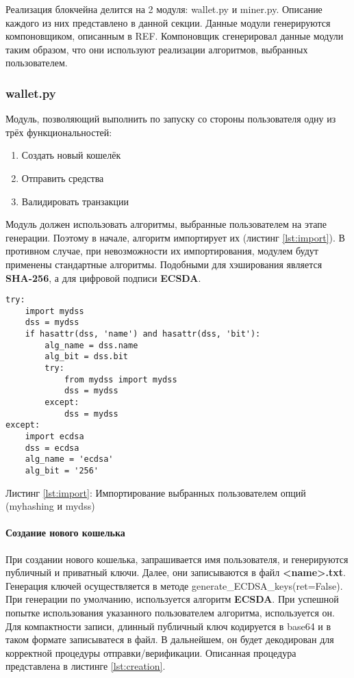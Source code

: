 Реализация блокчейна делится на 2 модуля: {\small wallet.py} и {\small
miner.py}. Описание каждого из них представлено в данной секции.
Данные модули генерируются компоновщиком, описанным в REF. Компоновщик
сгенерировал данные модули таким образом, что они используют реализации
алгоритмов, выбранных пользователем.

\subsubsection{wallet.py}
Модуль, позволяющий выполнить по запуску со стороны пользователя одну из трёх
функциональностей:

\begin{enumerate}
    \item Создать новый кошелёк
    \item Отправить средства
    \item Валидировать транзакции
\end{enumerate}


Модуль должен использовать алгоритмы, выбранные пользователем на этапе
генерации. Поэтому в начале, алгоритм импортирует их (листинг
\ref{lst:import}). В противном случае, при невозможности их импортирования,
модулем будут применены стандартные алгоритмы.  Подобными для хэширования
является \textbf{SHA-256}, а для цифровой подписи \textbf{ECSDA}. 

\begin{center}
\begin{lstlisting}
try:
    import mydss
    dss = mydss
    if hasattr(dss, 'name') and hasattr(dss, 'bit'):
        alg_name = dss.name
        alg_bit = dss.bit
        try:
            from mydss import mydss
            dss = mydss
        except:
            dss = mydss
except:
    import ecdsa
    dss = ecdsa
    alg_name = 'ecdsa'
    alg_bit = '256'
\end{lstlisting}\label{lst:import}
    Листинг \ref{lst:import}: Импортирование выбранных пользователем опций (myhashing и mydss)
\end{center}

\paragraph{Создание нового кошелька}
При создании нового кошелька, запрашивается имя пользователя, и генерируются
публичный и приватный ключи. Далее, они записываются в файл
\textbf{<name>.txt}.  Генерация ключей осуществляется в методе {\small
generate\_ECDSA\_keys(ret=False)}.  При генерации по умолчанию, используется
алгоритм \textbf{ECSDA}. При успешной попытке использования указанного
пользователем алгоритма, используется он. Для компактности записи, длинный
публичный ключ кодируется в base64 и в таком формате записыватеся в файл. В
дальнейшем, он будет декодирован для корректной процедуры отправки/верификации.
Описанная процедура представлена в листинге \ref{lst:creation}.

